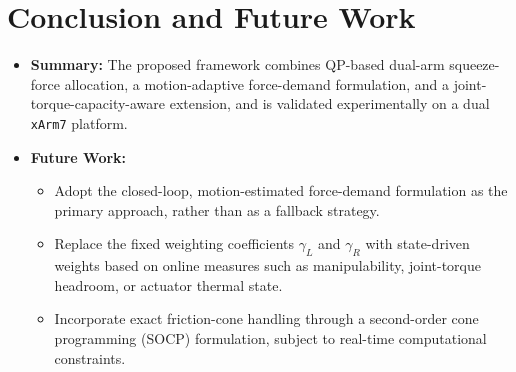 \documentclass[conference]{IEEEtran}
\begin{document}
\section{Conclusion and Future Work}
\begin{itemize}
    \item \textbf{Summary:} The proposed framework combines QP-based dual-arm squeeze-force allocation, a motion-adaptive force-demand formulation, and a joint-torque-capacity-aware extension, and is validated experimentally on a dual \texttt{xArm7} platform.

    \item \textbf{Future Work:}
    \begin{itemize}
        \item Adopt the closed-loop, motion-estimated force-demand formulation as the primary approach, rather than as a fallback strategy.
        \item Replace the fixed weighting coefficients \(\gamma_L\) and \(\gamma_R\) with state-driven weights based on online measures such as manipulability, joint-torque headroom, or actuator thermal state.
        \item Incorporate exact friction-cone handling through a second-order cone programming (SOCP) formulation, subject to real-time computational constraints.
    \end{itemize}
\end{itemize}
\end{document}
